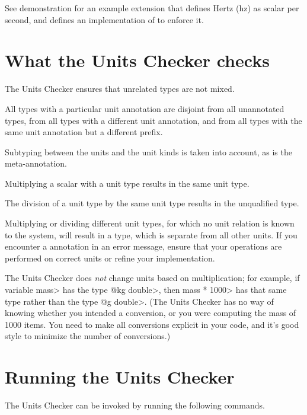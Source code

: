 See demonstration  for an example
extension that defines Hertz (hz) as scalar per second, and defines an
implementation of  to enforce it.



\section{What the Units Checker checks\label{units-checks}}

The Units Checker ensures that unrelated types are not mixed.

All types with a particular unit annotation are
disjoint from all unannotated types, from all types with a different unit
annotation, and from all types with the same unit annotation but a
different prefix.

Subtyping between the units and the unit kinds is taken into account,
as is the  meta-annotation.

Multiplying a scalar with a unit type results in the same unit type.

The division of a unit type by the same unit type
results in the unqualified type.

Multiplying or dividing different unit types, for which no unit
relation is known to the system, will result in a 
type, which is separate from all other units.
If you encounter a  annotation in an error message,
ensure that your operations are performed on correct units or refine
your  implementation.

The Units Checker does \emph{not} change units based on multiplication; for
example, if variable \<mass> has the type \<@kg double>, then \<mass *
1000> has that same type rather than the type \<@g double>.  (The Units
Checker has no way of knowing whether you intended a conversion, or you
were computing the mass of 1000 items.  You need to make all conversions
explicit in your code, and it's good style to minimize the number of
conversions.)


\section{Running the Units Checker\label{units-running}}

The Units Checker can be invoked by running the following commands.

